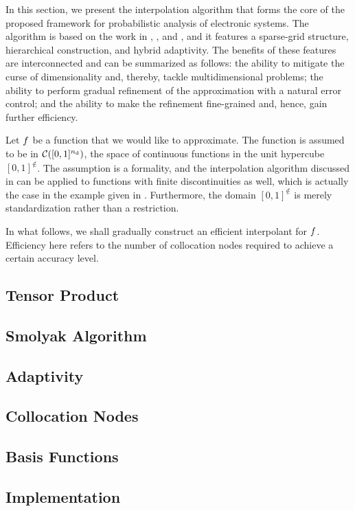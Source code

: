 In this section, we present the interpolation algorithm that forms the core of
the proposed framework for probabilistic analysis of electronic systems. The
algorithm is based on the work in \cite{klimke2006}, \cite{ma2009}, and
\cite{jakeman2012}, and it features a sparse-grid structure, hierarchical
construction, and hybrid adaptivity. The benefits of these features are
interconnected and can be summarized as follows: the ability to mitigate the
curse of dimensionality and, thereby, tackle multidimensional problems; the
ability to perform gradual refinement of the approximation with a natural error
control; and the ability to make the refinement fine-grained and, hence, gain
further efficiency.

Let $f$ be a function that we would like to approximate. The function is
assumed to be in $\mathcal{C}([0, 1]^{n_\text{d}})$, the space of continuous functions
in the unit hypercube $[0, 1]^\nin$. The assumption is a formality, and the
interpolation algorithm discussed in  can be applied to
functions with finite discontinuities as well, which is actually the case in the
example given in . Furthermore, the domain $[0, 1]^\nin$ is
merely standardization rather than a restriction.

In what follows, we shall gradually construct an efficient interpolant for $f$.
Efficiency here refers to the number of collocation nodes required to achieve a
certain accuracy level.

\subsection{Tensor Product} 


\subsection{Smolyak Algorithm} 


\subsection{Adaptivity} 


\subsection{Collocation Nodes} 


\subsection{Basis Functions} 


\subsection{Implementation} 

